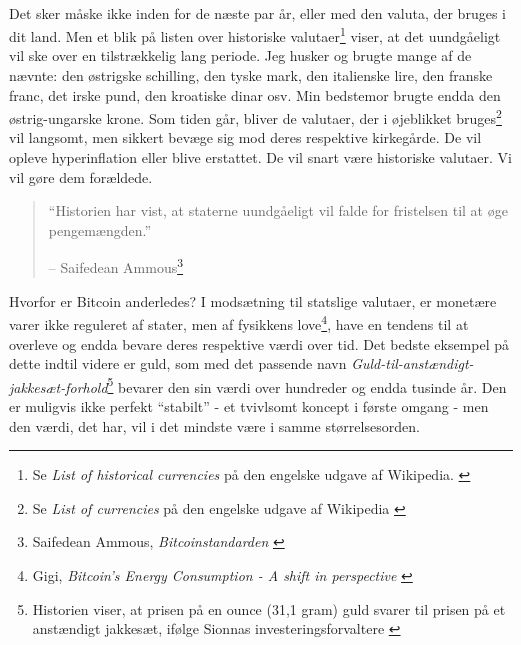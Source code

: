 \documentclass[paper=6in:9in,pagesize=pdftex,
               headinclude=on,footinclude=on,12pt]{scrbook}
\begin{document}
\paragraph{} Det sker måske ikke inden for de næste par år, eller med den valuta, der bruges i dit land. Men et blik på listen over historiske valutaer\footnote{Se \textit{List of historical currencies} på den engelske udgave af Wikipedia. \cite{wiki:historical-currencies}} viser, at det uundgåeligt vil ske over en tilstrækkelig lang periode. Jeg husker og brugte mange af de nævnte: den østrigske schilling, den tyske mark, den italienske lire, den franske franc, det irske pund, den kroatiske dinar osv. Min bedstemor brugte endda den østrig-ungarske krone. Som tiden går, bliver de valutaer, der i øjeblikket bruges\footnote{Se \textit{List of currencies} på den engelske udgave af Wikipedia \cite{wiki:list-of-currencies}} vil langsomt, men sikkert bevæge sig mod deres respektive kirkegårde. De vil opleve hyperinflation eller blive erstattet. De vil snart være historiske valutaer. Vi vil gøre dem forældede.\begin{quotation}\begin{samepage} \enquote{Historien har vist, at staterne uundgåeligt vil falde for fristelsen til at øge pengemængden.} \begin{flushright} -- Saifedean Ammous\footnote{Saifedean Ammous, \textit{Bitcoinstandarden} \cite{bitcoin-standard}}
\end{flushright}\end{samepage}\end{quotation}

\newpage

Hvorfor er Bitcoin anderledes? I modsætning til statslige valutaer, er monetære varer ikke reguleret af stater, men af fysikkens love\footnote{Gigi, \textit{Bitcoin's Energy Consumption - A shift in perspective} \cite{gigi:energy}}, have en tendens til at overleve og endda bevare deres respektive værdi over tid. Det bedste eksempel på dette indtil videre er guld, som med det passende navn \textit{Guld-til-anstændigt-jakkesæt-forhold}\footnote{Historien viser, at prisen på en ounce (31,1 gram) guld svarer til prisen på et anstændigt jakkesæt, ifølge Sionnas investeringsforvaltere \cite{web:gold-to-decent-suite-ratio}} bevarer den sin værdi over hundreder og endda tusinde år. Den er muligvis ikke perfekt \enquote{stabilt} - et tvivlsomt koncept i første omgang - men den værdi, det har, vil i det mindste være i samme størrelsesorden.
\end{document}
